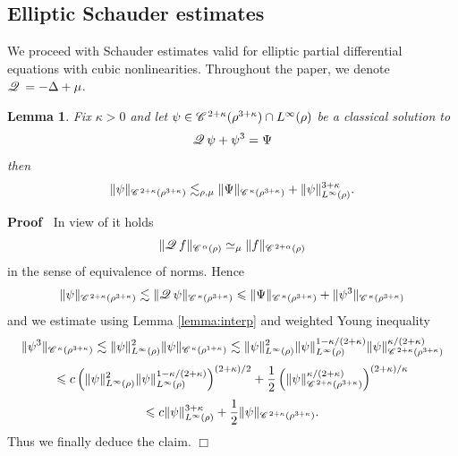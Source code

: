 \documentclass[a4paper,11pt]{article}
\renewcommand{\leq}{\leqslant}
\newenvironment{proof}{\noindent\textbf{Proof\ }}{\hspace*{\fill}$\Box$\medskip}
\newtheorem{lemma}[theorem]{Lemma}
\numberwithin{equation}{section}
\newcommand{\CC}{\mathscr{C} \hspace{.1em}}
\newcommand{\Q}{\mathscr{Q} \hspace{.2em}}
\newcommand{\8}{\infty}
\begin{document}
\subsection{Elliptic Schauder estimates}
\label{s:ell1}


We proceed with Schauder estimates valid for elliptic partial differential equations with cubic nonlinearities. Throughout the paper, we denote $\Q=-\Delta+\mu$.

\begin{lemma}
  \label{lemma:schauder-ellptic}Fix $\kappa > 0$ and let $\psi \in \CC^{2 +
  \kappa} (\rho^{3 + \kappa}) \cap L^{\infty} (\rho)$ be a classical solution
  to
  \[ \Q \psi + \psi^3 = \Psi \]
  then
  \[ \| \psi \|_{\CC^{2 + \kappa} (\rho^{3 + \kappa})} \lesssim_{\rho,\mu}  \|
     \Psi \|_{\CC^{\kappa} (\rho^{3 + \kappa})} + \| \psi \|_{L^{\infty}
     (\rho)}^{3 + \kappa}. \]
\end{lemma}



\begin{proof}
In view of \cite[Theorem 6.5]{T06} it holds
$$
\|\Q f\|_{\CC^\alpha(\rho)}\simeq_{\mu} \|f\|_{\CC^{2+\alpha}(\rho)}
$$
in the sense of equivalence of norms. Hence
$$
\|\psi\|_{\CC^{2+\kappa}(\rho^{3+\kappa})}\lesssim \|\Q\psi\|_{\CC^\kappa(\rho^{3+\kappa})}\leqslant \|\Psi\|_{\CC^\kappa(\rho^{3+\kappa})}+\|\psi^3\|_{\CC^\kappa(\rho^{3+\kappa})}
$$
and we estimate  using Lemma \ref{lemma:interp} and weighted Young inequality 
  \[ \| \psi^3 \|_{\CC^{\kappa} (\rho^{3 + \kappa})} \lesssim \| \psi
     \|_{L^{\infty} (\rho)}^2 \| \psi \|_{\CC^{\kappa} (\rho^{1 + \kappa})}\lesssim \| \psi
     \|_{L^{\infty} (\rho)}^2 \| \psi \|_{L^{\infty} (\rho)}^{1 - \kappa / (2
     + \kappa)} \| \psi \|_{\CC^{2 + \kappa} (\rho^{3 + \kappa})}^{\kappa / (2
     + \kappa)}
    \]
    \[
    \leq
    c\left( \|\psi\|_{L^{\infty} (\rho)}^2 \| \psi \|_{L^{\infty} (\rho)}^{1 - \kappa / (2
     + \kappa)}\right)^{(2 + \kappa) / 2} + \frac{1}{2}\left( \| \psi \|_{\CC^{2 +
     \kappa} (\rho^{3 + \kappa})}^{\kappa / (2 + \kappa)} \right)^{(2 +
     \kappa) / \kappa}
     \]
     \[
     \leqslant c\| \psi
     \|_{L^{\infty} (\rho)}^{3 + \kappa} +
     \frac{1}{2} \| \psi \|_{\CC^{2 + \kappa} (\rho^{3 + \kappa})} .
    \]
Thus we finally deduce the claim.
\end{proof}
\end{document}
